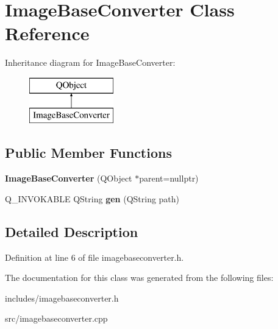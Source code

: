 \hypertarget{classImageBaseConverter}{}\section{Image\+Base\+Converter Class Reference}
\label{classImageBaseConverter}
Inheritance diagram for Image\+Base\+Converter\+:\begin{figure}[H]
\begin{center}
\leavevmode
\includegraphics[height=2.000000cm]{classImageBaseConverter}
\end{center}
\end{figure}
\subsection*{Public Member Functions}
\begin{DoxyCompactItemize}
\item 
\mbox{\label{classImageBaseConverter_ad5a3543b251a7395d73a8888ab1baa00}} 
{\bfseries Image\+Base\+Converter} (Q\+Object $\ast$parent=nullptr)
\item 
\mbox{\label{classImageBaseConverter_a01ed6b49c6d050860c84c07fb894be62}} 
Q\+\_\+\+I\+N\+V\+O\+K\+A\+B\+LE Q\+String {\bfseries gen} (Q\+String path)
\end{DoxyCompactItemize}


\subsection{Detailed Description}


Definition at line 6 of file imagebaseconverter.\+h.



The documentation for this class was generated from the following files\+:\begin{DoxyCompactItemize}
\item 
includes/imagebaseconverter.\+h\item 
src/imagebaseconverter.\+cpp\end{DoxyCompactItemize}
